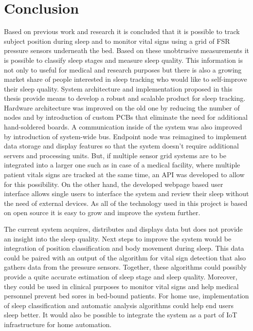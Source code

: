 \chapter{Conclusion}
\label{chap:conclusion}

Based on previous work and research it is concluded that it is possible to track subject position during sleep and to monitor vital signs using a grid of \ac{FSR} pressure sensors underneath the bed. Based on these unobtrusive measurements it is possible to classify sleep stages and measure sleep quality. This information is not only to useful for medical and research purposes but there is also a growing market share of people interested in sleep tracking who would like to self-improve their sleep quality. System architecture and implementation proposed in this thesis provide means to develop a robust and scalable product for sleep tracking. Hardware architecture was improved on the old one by reducing the number of nodes and by introduction of custom \ac{PCB}s that eliminate the need for additional hand-soldered boards. A communication inside of the system was also improved by introduction of system-wide bus. Endpoint node was reimagined to implement data storage and display features so that the system doesn't require additional servers and processing units. But, if multiple sensor grid systems are to be integrated into a larger one such as in case of a medical facility, where multiple patient vitals signs are tracked at the same time, an \ac{API} was developed to allow for this possibility. On the other hand, the developed webpage based user interface allows single users to interface the system and review their sleep without the need of external devices. As all of the technology used in this project is based on open source it is easy to grow and improve the system further.

The current system acquires, distributes and displays data but does not provide an insight into the sleep quality. Next steps to improve the system would be integration of position classification and body movement during sleep. This data could be paired with an output of the algorithm for vital sign detection that also gathers data from the pressure sensors. Together, these algorithms could possibly provide a quite accurate estimation of sleep stage and sleep quality. Moreover, they could be used in clinical purposes to monitor vital signs and help medical personnel prevent bed sores in bed-bound patients. For home use, implementation of sleep classification and automatic analysis algorithms could help end users sleep better. It would also be possible to integrate the system as a part of \ac{IoT} infrastructure for home automation.